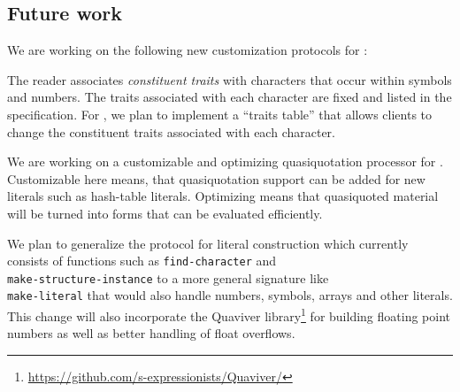 

\subsection{Future work}

We are working on the following new customization protocols for
\eclector{}:

The \cl{} reader associates \emph{constituent traits} with characters
that occur within symbols and numbers.  The traits associated with
each character are fixed and listed in the \cl{} specification.  For
\eclector, we plan to implement a ``traits table'' that allows clients
to change the constituent traits associated with each character.

We are working on a customizable and optimizing quasiquotation
processor for \eclector{}.  Customizable here means, that
quasiquotation support can be added for new literals such as
hash-table literals.  Optimizing means that quasiquoted material will
be turned into forms that can be evaluated efficiently.

We plan to generalize the protocol for literal construction which
currently consists of functions such as
\texttt{find-character} and\\
\texttt{make-structure-instance} to a more general signature
like\\
\texttt{make-literal} that would also handle numbers,
symbols, arrays and other literals.  This change will also incorporate
the Quaviver
library\footnote{\url{https://github.com/s-expressionists/Quaviver/}}
for building floating point numbers as well as better handling of
float overflows.

